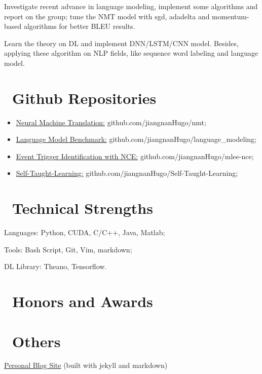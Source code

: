\documentclass{resume}
\begin{document}
Investigate recent advance in language modeling, implement some algorithms and report on the group; tune the NMT model with sgd, adadelta and momentum-based algorithms for better BLEU results.

Learn the theory on DL and implement DNN/LSTM/CNN model. Besides, applying these algorithm on NLP fields, like sequence word labeling and language model.



\section{\faGithub\ Github Repositories}
\begin{itemize}[parsep=0.5ex]
  \item \href{https://github.com/jiangnanHugo/nmt}{Neural Machine Translation:} github.com/jiangnanHugo/nmt;
  \item \href{https://github.com/jiangnanHugo/language_modeling}{Language Model Benchmark:} github.com/jiangnanHugo/language\_modeling;
  \item \href{https://github.com/jiangnanHugo/mlee-nce}{Event Trigger Identification with NCE:} github.com/jiangnanHugo/mlee-nce;
  \item \href{https://github.com/jiangnanHugo/Self-Taught-Learning}{Self-Taught-Learning:} github.com/jiangnanHugo/Self-Taught-Learning;
\end{itemize}
\section{\faCogs\ Technical Strengths}

Languages: Python, CUDA, C/C++, Java, Matlab;

Tools: Bash Script, Git, Vim, markdown;

DL Library: Theano, Tensorflow.


\section{\faStar\ Honors and Awards}

\section{\faStar\ Others}
\href{https://jiangnanhugo.github.io/blog/}{Personal Blog Site} (built with jekyll and markdown)
\end{document}
